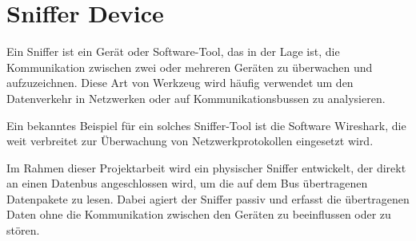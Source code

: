 



\section{Sniffer Device}



Ein Sniffer ist ein Gerät oder Software-Tool, das in der Lage ist, die Kommunikation zwischen zwei oder mehreren Geräten zu überwachen und aufzuzeichnen. Diese Art von Werkzeug wird häufig verwendet um den Datenverkehr in Netzwerken oder auf Kommunikationsbussen zu analysieren.

Ein bekanntes Beispiel für ein solches Sniffer-Tool ist die Software Wireshark, die weit verbreitet zur Überwachung von Netzwerkprotokollen eingesetzt wird.

Im Rahmen dieser Projektarbeit wird ein physischer Sniffer entwickelt, der direkt an einen Datenbus angeschlossen wird, um die auf dem Bus übertragenen Datenpakete zu lesen. Dabei agiert der Sniffer passiv und erfasst die übertragenen Daten ohne die Kommunikation zwischen den Geräten zu beeinflussen
oder zu stören.


